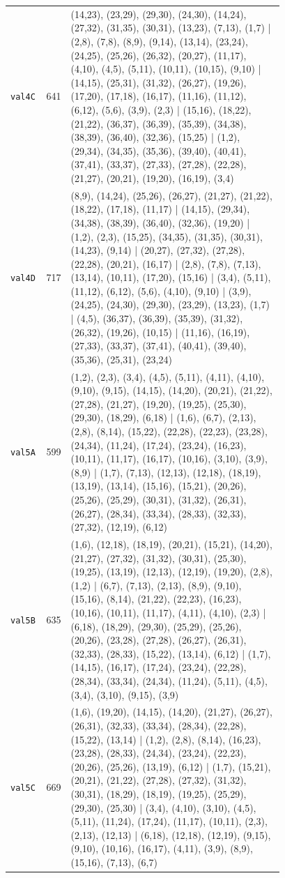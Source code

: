 \begin{landscape}
\begin{longtable}{lr>{\tiny\raggedright\arraybackslash}p{0.78\linewidth}}
\texttt{val4C} & 641 & (14,23), (23,29), (29,30), (24,30), (14,24), (27,32), (31,35), (30,31), (13,23), (7,13), (1,7) | (2,8), (7,8), (8,9), (9,14), (13,14), (23,24), (24,25), (25,26), (26,32), (20,27), (11,17), (4,10), (4,5), (5,11), (10,11), (10,15), (9,10) | (14,15), (25,31), (31,32), (26,27), (19,26), (17,20), (17,18), (16,17), (11,16), (11,12), (6,12), (5,6), (3,9), (2,3) | (15,16), (18,22), (21,22), (36,37), (36,39), (35,39), (34,38), (38,39), (36,40), (32,36), (15,25) | (1,2), (29,34), (34,35), (35,36), (39,40), (40,41), (37,41), (33,37), (27,33), (27,28), (22,28), (21,27), (20,21), (19,20), (16,19), (3,4) \\[2pt]
\texttt{val4D} & 717 & (8,9), (14,24), (25,26), (26,27), (21,27), (21,22), (18,22), (17,18), (11,17) | (14,15), (29,34), (34,38), (38,39), (36,40), (32,36), (19,20) | (1,2), (2,3), (15,25), (34,35), (31,35), (30,31), (14,23), (9,14) | (20,27), (27,32), (27,28), (22,28), (20,21), (16,17) | (2,8), (7,8), (7,13), (13,14), (10,11), (17,20), (15,16) | (3,4), (5,11), (11,12), (6,12), (5,6), (4,10), (9,10) | (3,9), (24,25), (24,30), (29,30), (23,29), (13,23), (1,7) | (4,5), (36,37), (36,39), (35,39), (31,32), (26,32), (19,26), (10,15) | (11,16), (16,19), (27,33), (33,37), (37,41), (40,41), (39,40), (35,36), (25,31), (23,24) \\[2pt]
\texttt{val5A} & 599 & (1,2), (2,3), (3,4), (4,5), (5,11), (4,11), (4,10), (9,10), (9,15), (14,15), (14,20), (20,21), (21,22), (27,28), (21,27), (19,20), (19,25), (25,30), (29,30), (18,29), (6,18) | (1,6), (6,7), (2,13), (2,8), (8,14), (15,22), (22,28), (22,23), (23,28), (24,34), (11,24), (17,24), (23,24), (16,23), (10,11), (11,17), (16,17), (10,16), (3,10), (3,9), (8,9) | (1,7), (7,13), (12,13), (12,18), (18,19), (13,19), (13,14), (15,16), (15,21), (20,26), (25,26), (25,29), (30,31), (31,32), (26,31), (26,27), (28,34), (33,34), (28,33), (32,33), (27,32), (12,19), (6,12) \\[2pt]
\texttt{val5B} & 635 & (1,6), (12,18), (18,19), (20,21), (15,21), (14,20), (21,27), (27,32), (31,32), (30,31), (25,30), (19,25), (13,19), (12,13), (12,19), (19,20), (2,8), (1,2) | (6,7), (7,13), (2,13), (8,9), (9,10), (15,16), (8,14), (21,22), (22,23), (16,23), (10,16), (10,11), (11,17), (4,11), (4,10), (2,3) | (6,18), (18,29), (29,30), (25,29), (25,26), (20,26), (23,28), (27,28), (26,27), (26,31), (32,33), (28,33), (15,22), (13,14), (6,12) | (1,7), (14,15), (16,17), (17,24), (23,24), (22,28), (28,34), (33,34), (24,34), (11,24), (5,11), (4,5), (3,4), (3,10), (9,15), (3,9) \\[2pt]
\texttt{val5C} & 669 & (1,6), (19,20), (14,15), (14,20), (21,27), (26,27), (26,31), (32,33), (33,34), (28,34), (22,28), (15,22), (13,14) | (1,2), (2,8), (8,14), (16,23), (23,28), (28,33), (24,34), (23,24), (22,23), (20,26), (25,26), (13,19), (6,12) | (1,7), (15,21), (20,21), (21,22), (27,28), (27,32), (31,32), (30,31), (18,29), (18,19), (19,25), (25,29), (29,30), (25,30) | (3,4), (4,10), (3,10), (4,5), (5,11), (11,24), (17,24), (11,17), (10,11), (2,3), (2,13), (12,13) | (6,18), (12,18), (12,19), (9,15), (9,10), (10,16), (16,17), (4,11), (3,9), (8,9), (15,16), (7,13), (6,7) \\[2pt]

\end{longtable}
\end{landscape}
